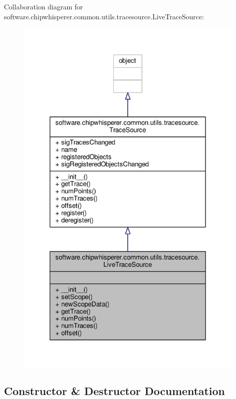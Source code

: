 Collaboration diagram for software.\+chipwhisperer.\+common.\+utils.\+tracesource.\+Live\+Trace\+Source\+:\nopagebreak
\begin{figure}[H]
\begin{center}
\leavevmode
\includegraphics[width=316pt]{d6/da5/classsoftware_1_1chipwhisperer_1_1common_1_1utils_1_1tracesource_1_1LiveTraceSource__coll__graph}
\end{center}
\end{figure}


\subsection{Constructor \& Destructor Documentation}
\hypertarget{classsoftware_1_1chipwhisperer_1_1common_1_1utils_1_1tracesource_1_1LiveTraceSource_ab9a204343381bc0dfedbfeea8a053715}{}
